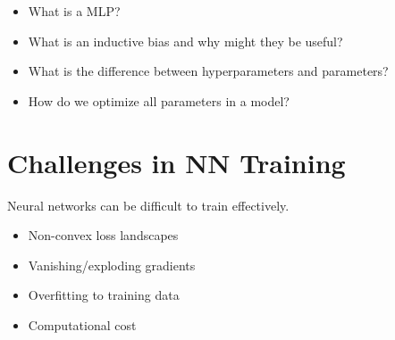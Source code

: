 \begin{summary}
    \begin{itemize}
        \item What is a MLP?
        \item What is an inductive bias and why might they be useful?
        \item What is the difference between hyperparameters and parameters?
        \item How do we optimize all parameters in a model?
    \end{itemize}
\end{summary}

\section{Challenges in NN Training}
\begin{notes}
    Neural networks can be difficult to train effectively.
    \begin{itemize}
        \item Non-convex loss landscapes
        \item Vanishing/exploding gradients
        \item Overfitting to training data
        \item Computational cost
    \end{itemize}
\end{notes}
\newpage

